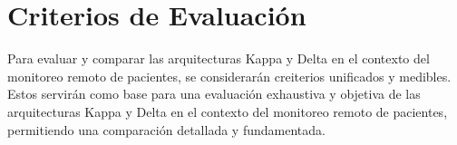 \section{Criterios de Evaluación}

Para evaluar y comparar las arquitecturas Kappa y Delta en el contexto del monitoreo remoto de pacientes, se considerarán creiterios unificados y medibles.
Estos servirán como base para una evaluación exhaustiva y objetiva de las arquitecturas Kappa y Delta en el contexto del monitoreo remoto de pacientes, permitiendo una comparación detallada y fundamentada.




\newpage


\newpage